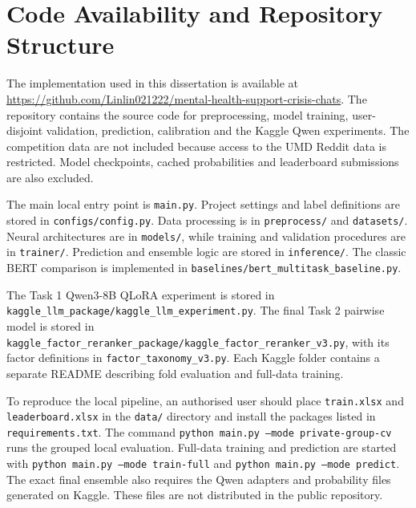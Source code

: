 \chapter{Code Availability and Repository Structure}
\label{app:code-availability}

The implementation used in this dissertation is available at
\url{https://github.com/Linlin021222/mental-health-support-crisis-chats}.
The repository contains the source code for preprocessing, model training,
user-disjoint validation, prediction, calibration and the Kaggle Qwen
experiments. The competition data are not included because access to the UMD
Reddit data is restricted. Model checkpoints, cached probabilities and
leaderboard submissions are also excluded.

The main local entry point is \texttt{main.py}. Project settings and label
definitions are stored in \texttt{configs/config.py}. Data processing is in
\texttt{preprocess/} and \texttt{datasets/}. Neural architectures are in
\texttt{models/}, while training and validation procedures are in
\texttt{trainer/}. Prediction and ensemble logic are stored in
\texttt{inference/}. The classic BERT comparison is implemented in
\texttt{baselines/bert\_multitask\_baseline.py}.

The Task 1 Qwen3-8B QLoRA experiment is stored in
\texttt{kaggle\_llm\_package/kaggle\_llm\_experiment.py}. The final Task 2
pairwise model is stored in
\texttt{kaggle\_factor\_reranker\_package/kaggle\_factor\_reranker\_v3.py},
with its factor definitions in \texttt{factor\_taxonomy\_v3.py}. Each Kaggle
folder contains a separate README describing fold evaluation and full-data
training.

To reproduce the local pipeline, an authorised user should place
\texttt{train.xlsx} and \texttt{leaderboard.xlsx} in the \texttt{data/}
directory and install the packages listed in \texttt{requirements.txt}. The
command \texttt{python main.py --mode private-group-cv} runs the grouped local
evaluation. Full-data training and prediction are started with
\texttt{python main.py --mode train-full} and
\texttt{python main.py --mode predict}. The exact final ensemble also requires
the Qwen adapters and probability files generated on Kaggle. These files are
not distributed in the public repository.

